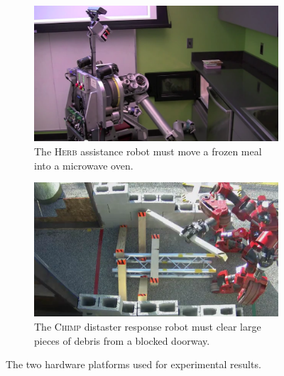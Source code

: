 \begin{figure}
{\setlength{\offsetpage}{0.5in}
\begin{widepage}
   \centering
   \begin{subfigure}[t]{0.48\textwidth}
      \includegraphics[width=\textwidth]{figs/herb-microwave-intro.png}
      \caption{The \textsc{Herb} assistance robot
         must move a frozen meal into a microwave oven.
         }
      \label{fig:exp-platforms-herb}
   \end{subfigure}%
   \quad%
   \begin{subfigure}[t]{0.48\textwidth}
      \includegraphics[width=\textwidth]{figs/chimp-debris-overhead.png}
      \caption{The \textsc{Chimp} distaster response robot
         must clear large pieces of debris from a blocked doorway.}
      \label{fig:exp-platforms-chimp}
   \end{subfigure}
   \caption{The two hardware platforms used for experimental
      results.}
   \label{fig:exp-platforms}
\end{widepage}
}%
\end{figure}

